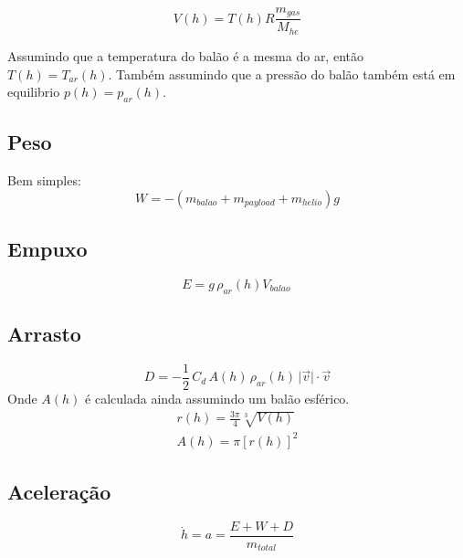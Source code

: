 \documentclass[a4paper, 12pt]{article}
\begin{document}
\begin{equation}
  V (h) =   T(h) R \frac{m_{gas}}{M_{he}}
\end{equation}

Assumindo que a temperatura do balão é a mesma do ar, então $T(h) = T_{ar}(h)$.
Também assumindo que a pressão do balão também está em equilibrio $p(h) = p_{ar}(h)$.

\subsection {Peso}
Bem simples:
\begin{equation}
  W = -\left( m_{balao} + m_{payload} + m_{helio} \right) g
\end{equation}

\subsection {Empuxo}
\begin{equation}
  E = g \, \rho_{ar}(h) V_{balao} \,
\end{equation}
\subsection {Arrasto}
\begin{equation}
  D = -\frac{1}{2} \, C_d \, A(h) \, \rho_{ar}(h) \,  \lvert \vec{v} \rvert \cdot \vec{v}
\end{equation}
Onde $A(h)$ é calculada ainda assumindo um balão esférico.
\begin{gather}
  r(h) = \frac{3\pi}{4} \sqrt[3]{V(h)} \\
  A(h) = \pi \left[r(h)\right]^2
\end{gather}
\subsection {Aceleração}
\begin{equation}
  \dot h = a = \frac{E + W + D}{m_{total}}
\end{equation}
\end{document}
